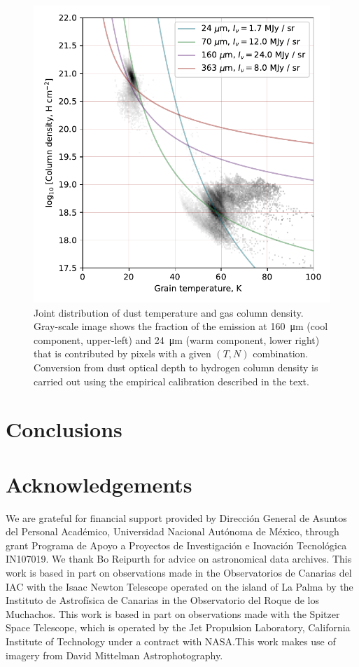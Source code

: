 \documentclass[useAMS, usenatbib, a4paper]{mnras}
\begin{document}
\begin{figure}
  \includegraphics[width=\linewidth]{figs/sigma-ori-N-T-histogram}
  \caption{Joint distribution of dust temperature and gas column
    density. Gray-scale image shows the fraction of the emission at
    \SI{160}{\um} (cool component, upper-left) and \SI{24}{\um} (warm
    component, lower right) that is contributed by pixels with a given
    \((T, N)\) combination. Conversion from dust optical depth to
    hydrogen column density is carried out using the empirical
    calibration described in the text.}
  \label{fig:N-T-distro}
\end{figure}

\section{Conclusions}
\label{sec:conclusions}

\section*{Acknowledgements}

We are grateful for financial support provided by Dirección General de
Asuntos del Personal Académico, Universidad Nacional Autónoma de
México, through grant Programa de Apoyo a Proyectos de Investigación e
Inovación Tecnológica IN107019.  We thank Bo Reipurth for advice on
astronomical data archives.  This work is based in part on
observations made in the Observatorios de Canarias del IAC with the
Isaac Newton Telescope operated on the island of La Palma by the
Instituto de Astrofísica de Canarias in the Observatorio del Roque de
los Muchachos. 
This work is based in part on observations made with the Spitzer Space
Telescope, which is operated by the Jet Propulsion Laboratory,
California Institute of Technology under a contract with NASA.\@ This
work makes use of imagery from David Mittelman Astrophotography.




\bsp	%
\label{lastpage}
\end{document}
